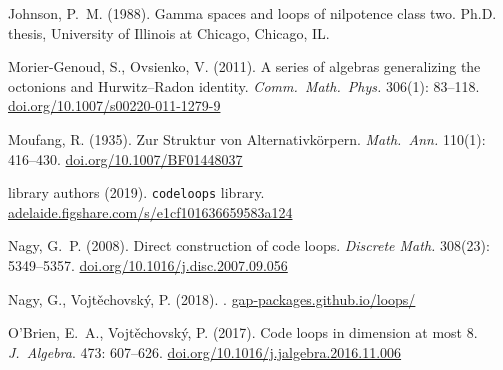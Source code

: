 \documentclass{article}
\theoremstyle{plain}
\theoremstyle{definition}
\begin{document}
\begin{thebibliography}{10}
Johnson, P.~M. (1988).
\newblock Gamma spaces and loops of nilpotence class two.
\newblock Ph.D. thesis, University of Illinois at Chicago, Chicago, IL.


Morier-Genoud, S., Ovsienko, V. (2011).
\newblock A series of algebras generalizing the octonions and Hurwitz--Radon
  identity.
\newblock \emph{Comm.\ Math.\ Phys.} 306(1): 83--118.
\newblock \url{doi.org/10.1007/s00220-011-1279-9}

Moufang, R. (1935).
\newblock Zur {S}truktur von {A}lternativk\"{o}rpern.
\newblock \emph{Math.\ Ann.} 110(1): 416--430.
\newblock \url{doi.org/10.1007/BF01448037}

{library authors} (2019).
\newblock \texttt{codeloops} library.
\newblock \url{adelaide.figshare.com/s/e1cf101636659583a124} 

Nagy, G.~P. (2008).
\newblock Direct construction of code loops.
\newblock \emph{Discrete Math.} 308(23): 5349--5357.
\newblock \url{doi.org/10.1016/j.disc.2007.09.056}

Nagy, G., Vojt\v{e}chovsk\'{y}, P. (2018).
.
\newblock \url{gap-packages.github.io/loops/}

O'Brien, E.~A., Vojt\v{e}chovsk\'{y}, P. (2017).
\newblock Code loops in dimension at most 8.
\newblock \emph{J.\ Algebra}. 473: 607--626.
\newblock \url{doi.org/10.1016/j.jalgebra.2016.11.006}



\end{thebibliography}



\vfill\eject
\end{document}
